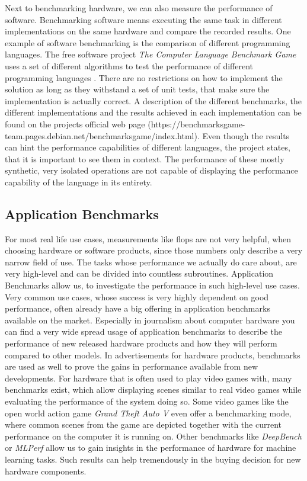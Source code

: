Next to benchmarking hardware, we can also measure the performance of software.
Benchmarking software means executing the same task in different implementations
on the same hardware and compare the recorded results. One example of software
benchmarking is the comparison of different programming languages. The free
software project \emph{The Computer Language Benchmark Game} uses a set of
different algorithms to test the performance of different programming languages
. There are no restrictions on how to implement the solution as long as they
withstand a set of unit tests, that make sure the implementation is actually
correct. A description of the different benchmarks, the different
implementations and the results achieved in each implementation can be found on
the projects official web page
(https://benchmarksgame-team.pages.debian.net/benchmarksgame/index.html). Even
though the results can hint the performance capabilities of different languages,
the project states, that it is important to see them in context. The performance
of these mostly synthetic, very isolated operations are not capable of
displaying the performance capability of the language in its entirety.
\cite{CompLangBenchmGame}



\subsection{Application Benchmarks}

For most real life use cases, measurements like \gls{flops} are not very
helpful, when choosing hardware or software products, since those numbers only
describe a very narrow field of use. The tasks whose performance we actually do
care about, are very high-level and can be divided into countless subroutines.
Application Benchmarks allow us, to investigate the performance in such
high-level use cases. Very common use cases, whose success is very highly
dependent on good performance, often already have a big offering in application
benchmarks available on the market. Especially in journalism about computer
hardware you can find a very wide spread usage of application benchmarks to
describe the performance of new released hardware products and how they will
perform compared to other models. In advertisements for hardware products,
benchmarks are used as well to prove the gains in performance available from new
developments. For hardware that is often used to play video games with, many
benchmarks exist, which allow displaying scenes similar to real video games
while evaluating the performance of the system doing so. Some video games like
the open world action game \emph{Grand Theft Auto V} even offer a benchmarking
mode, where common scenes from the game are depicted together with the current
performance on the computer it is running on. Other benchmarks like
\emph{DeepBench} or \emph{MLPerf} allow us to gain insights in the performance
of hardware for machine learning tasks. Such results can help tremendously in
the buying decision for new hardware components. 
\cite{ApplicationBenchmark, Gta5Bench}


